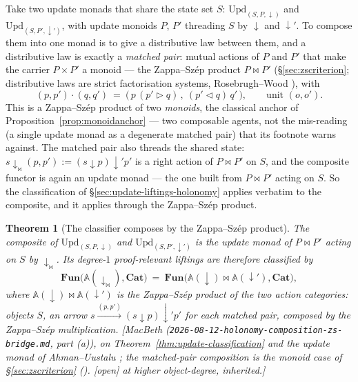 \documentclass[11pt,a4paper]{book}
\newcommand{\Cat}{\mathbf{Cat}}
\theoremstyle{plain}
\newtheorem{Theorem}{Theorem}[chapter]
\theoremstyle{definition}
\theoremstyle{remark}
\newcommand{\prov}[1]{\hfill\textsf{\footnotesize[#1]}}
\begin{document}
Take two update monads that share the state set $S$:
$\mathrm{Upd}_{(S,P,\downarrow)}$ and $\mathrm{Upd}_{(S,P',\downarrow')}$, with update
monoids $P$, $P'$ threading $S$ by $\downarrow$ and $\downarrow'$. To compose them into
one monad is to give a distributive law between them, and a distributive law is exactly
a \emph{matched pair}: mutual actions of $P$ and $P'$ that make the carrier $P\times P'$
a monoid --- the Zappa--Sz\'ep product $P\bowtie P'$ (\S\ref{sec:zscriterion};
distributive laws are strict factorisation systems, Rosebrugh--Wood \cite{RW}), with
\[
   (p,p')\cdot(q,q')\ =\ \bigl(\,p\,(p'\triangleright q)\,,\ (p'\triangleleft q)\,q'\,\bigr),
   \qquad\text{unit }(o,o').
\]
This is a Zappa--Sz\'ep product of two \emph{monoids}, the classical anchor of
Proposition~\ref{prop:monoidanchor} --- two composable agents, not the mis-reading (a
single update monad as a degenerate matched pair) that its footnote warns against. The
matched pair also threads the shared state: $s\downarrow_{\bowtie}(p,p'):=(s\downarrow
p)\downarrow' p'$ is a right action of $P\bowtie P'$ on $S$, and the composite functor
is again an update monad --- the one built from $P\bowtie P'$ acting on $S$. So the
classification of \S\ref{sec:update-liftings-holonomy} applies verbatim to the
composite, and it applies through the Zappa--Sz\'ep product.

\begin{Theorem}[The classifier composes by the Zappa--Sz\'ep product]\label{thm:classifier-composes}
The composite of $\mathrm{Upd}_{(S,P,\downarrow)}$ and $\mathrm{Upd}_{(S,P',\downarrow')}$
is the update monad of $P\bowtie P'$ acting on $S$ by $\downarrow_{\bowtie}$. Its
degree-$1$ proof-relevant liftings are therefore classified by
\[
   \mathbf{Fun}\bigl(\mathbb A(\downarrow_{\bowtie}),\Cat\bigr)
   \ =\
   \mathbf{Fun}\bigl(\mathbb A(\downarrow)\bowtie\mathbb A(\downarrow'),\Cat\bigr),
\]
where $\mathbb A(\downarrow)\bowtie\mathbb A(\downarrow')$ is the Zappa--Sz\'ep product
of the two action categories: objects $S$, an arrow $s\xrightarrow{(p,p')}(s\downarrow
p)\downarrow' p'$ for each matched pair, composed by the Zappa--Sz\'ep multiplication.
\prov{MacBeth (\texttt{2026-08-12-holonomy-composition-zs-bridge.md}, part (a)), on
Theorem~\ref{thm:update-classification} and the update monad of Ahman--Uustalu
\cite{AhmanUustalu13}; the matched-pair composition is the monoid case of
\S\ref{sec:zscriterion} (\cite{RW}). \textsf{[open]} at higher object-degree, inherited.}
\end{Theorem}
\end{document}
